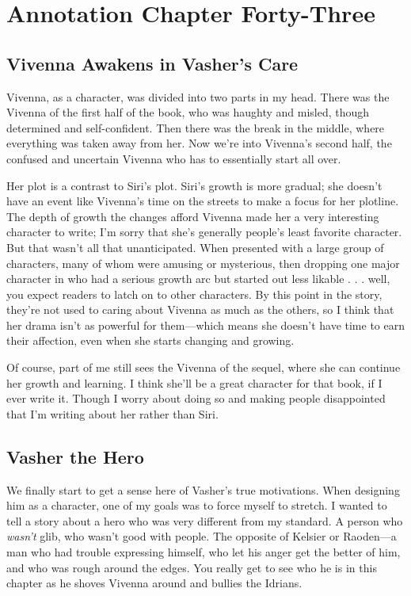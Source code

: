 \section{Annotation Chapter Forty-Three}

\subsection*{Vivenna Awakens in Vasher’s Care}

Vivenna, as a character, was divided into two parts in my head. There was the Vivenna of the first half of the book, who was haughty and misled, though determined and self-confident. Then there was the break in the middle, where everything was taken away from her. Now we’re into Vivenna’s second half, the confused and uncertain Vivenna who has to essentially start all over.

Her plot is a contrast to Siri’s plot. Siri’s growth is more gradual; she doesn’t have an event like Vivenna’s time on the streets to make a focus for her plotline. The depth of growth the changes afford Vivenna made her a very interesting character to write; I’m sorry that she’s generally people’s least favorite character. But that wasn’t all that unanticipated. When presented with a large group of characters, many of whom were amusing or mysterious, then dropping one major character in who had a serious growth arc but started out less likable . . . well, you expect readers to latch on to other characters. By this point in the story, they’re not used to caring about Vivenna as much as the others, so I think that her drama isn’t as powerful for them—which means she doesn’t have time to earn their affection, even when she starts changing and growing.

Of course, part of me still sees the Vivenna of the sequel, where she can continue her growth and learning. I think she’ll be a great character for that book, if I ever write it. Though I worry about doing so and making people disappointed that I’m writing about her rather than Siri.

\subsection*{Vasher the Hero}

We finally start to get a sense here of Vasher’s true motivations. When designing him as a character, one of my goals was to force myself to stretch. I wanted to tell a story about a hero who was very different from my standard. A person who \textit{wasn’t} glib, who wasn’t good with people. The opposite of Kelsier or Raoden—a man who had trouble expressing himself, who let his anger get the better of him, and who was rough around the edges. You really get to see who he is in this chapter as he shoves Vivenna around and bullies the Idrians.

